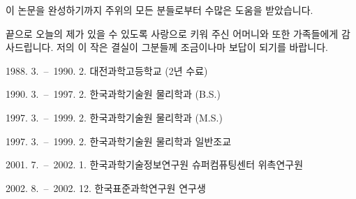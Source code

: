 \documentclass[doctor,english,final]{kaist-ucs}
\begin{document}

\acknowledgement[korean]

    이 논문을 완성하기까지 주위의 모든 분들로부터 수많은 도움을 받았습니다.

    끝으로 오늘의 제가 있을 수 있도록 사랑으로 키워 주신
    어머니와 또한 가족들에게 감사드립니다.
    저의 이 작은 결실이 그분들께 조금이나마 보답이 되기를 바랍니다.

\curriculumvitae[korean]

    \begin{personaldata}
        \address    {대전 유성구 구성동 ...}
    \end{personaldata}

    \begin{education}
        \item[1988. 3.\ --\ 1990. 2.] 대전과학고등학교 (2년 수료)
        \item[1990. 3.\ --\ 1997. 2.] 한국과학기술원 물리학과 (B.S.)
        \item[1997. 3.\ --\ 1999. 2.] 한국과학기술원 물리학과 (M.S.)
    \end{education}

    \begin{career}
        \item[1997. 3.\ --\ 1999. 2.] 한국과학기술원 물리학과 일반조교
        \item[2001. 7.\ --\ 2002. 1.] 한국과학기술정보연구원 슈퍼컴퓨팅센터 위촉연구원
        \item[2002. 8.\ --\ 2002. 12.] 한국표준과학연구원 연구생
    \end{career}
\end{document}
